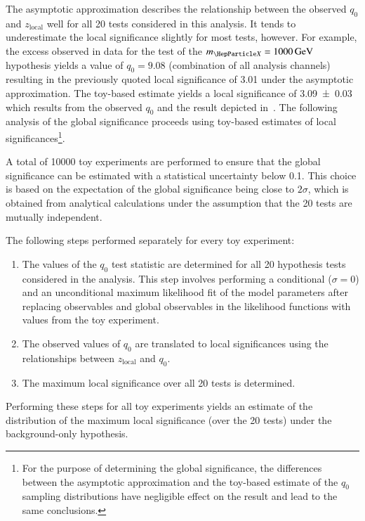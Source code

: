 The asymptotic approximation describes the relationship between the
observed $q_0$ and $z_{\text{local}}$ well for all 20 tests considered
in this analysis. It tends to underestimate the local significance
slightly for most tests, however. For example, the excess observed in
data for the test of the $\mX = \SI{1000}{\GeV}$ hypothesis yields a
value of $q_0 = \num{9.08}$ (combination of all analysis channels)
resulting in the previously quoted local significance of \num{3.01}
under the asymptotic approximation. The toy-based estimate yields a
local significance of \num{3.09 +- 0.03} which results from the
observed $q_0$ and the result depicted
in~. The following analysis of the
global significance proceeds using toy-based estimates of local
significances\footnote{For the purpose of determining the global
  significance, the differences between the asymptotic approximation
  and the toy-based estimate of the $q_0$ sampling distributions have
  negligible effect on the result and lead to the same conclusions.}.

A total of \num{10000} toy experiments are performed to ensure that
the global significance can be estimated with a statistical
uncertainty below \num{0.1}. This choice is based on the expectation
of the global significance being close to $2\sigma$, which is obtained
from analytical calculations under the assumption that the 20 tests
are mutually independent.

The following steps performed separately for every toy experiment:
\begin{enumerate}

\item The values of the $q_0$ test statistic are determined for all 20
  hypothesis tests considered in the analysis. This step involves
  performing a conditional ($\sigma = 0$) and an unconditional maximum
  likelihood fit of the model parameters after replacing observables
  and global observables in the likelihood functions with values from
  the toy experiment.

\item The observed values of $q_0$ are translated to local
  significances using the relationships between $z_{\text{local}}$ and
  $q_0$.

\item The maximum local significance over all 20 tests is determined.

\end{enumerate}
Performing these steps for all toy experiments yields an estimate of
the distribution of the maximum local significance (over the 20 tests)
under the background-only hypothesis.


